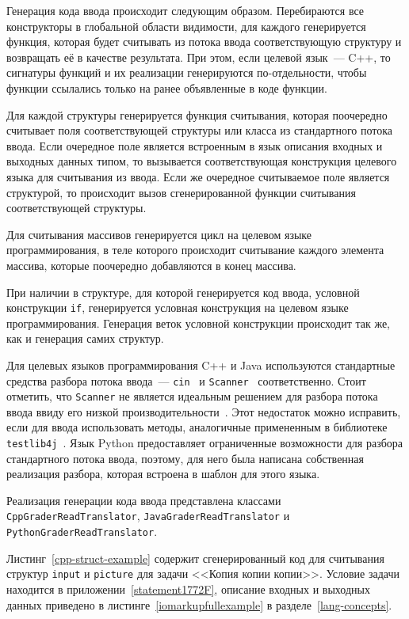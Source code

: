 \documentclass[times,specification,annotation]{style/itmo-student-thesis/itmo-student-thesis}
\begin{document}
Генерация кода ввода происходит следующим образом. Перебираются все конструкторы в глобальной области видимости, для каждого генерируется функция, которая будет считывать из потока ввода соответствующую структуру и возвращать её в качестве результата. При этом, если целевой язык~--- C++, то сигнатуры функций и их реализации генерируются по-отдельности, чтобы функции ссылались только на ранее объявленные в коде функции.

Для каждой структуры генерируется функция считывания, которая поочередно считывает поля соответствующей структуры или класса из стандартного потока ввода. Если очередное поле является встроенным в язык описания входных и выходных данных типом, то вызывается соответствующая конструкция целевого языка для считывания из ввода. Если же очередное считываемое поле является структурой, то происходит вызов сгенерированной функции считывания соответствующей структуры.

Для считывания массивов генерируется цикл на целевом языке программирования, в теле которого происходит считывание каждого элемента массива, которые поочередно добавляются в конец массива.

При наличии в структуре, для которой генерируется код ввода, условной конструкции \texttt{if}, генерируется условная конструкция на целевом языке программирования. Генерация веток условной конструкции происходит так же, как и генерация самих структур.

Для целевых языков программирования C++ и Java используются стандартные средства разбора потока ввода~--- \texttt{cin}~\cite{cppcin} и \texttt{Scanner}~\cite{javascanner} соответственно. Стоит отметить, что \texttt{Scanner} не является идеальным решением для разбора потока ввода ввиду его низкой производительности~\cite{slow-scanner}. Этот недостаток можно исправить, если для ввода использовать методы, аналогичные примененным в библиотеке \texttt{testlib4j}~\cite{testlib4j}. Язык Python предоставляет ограниченные возможности для разбора стандартного потока ввода, поэтому, для него была написана собственная реализация разбора, которая встроена в шаблон для этого языка.

Реализация генерации кода ввода представлена классами \texttt{CppGraderReadTranslator}, \texttt{JavaGraderReadTranslator} и \texttt{PythonGraderReadTranslator}.

Листинг~\ref{cpp-struct-example} содержит сгенерированный код для считывания структур \texttt{input} и \texttt{picture} для задачи <<Копия копии копии>>. Условие задачи находится в приложении~\ref{statement1772F}, описание входных и выходных данных приведено в листинге~\ref{iomarkupfullexample} в разделе~\ref{lang-concepts}.
\end{document}
